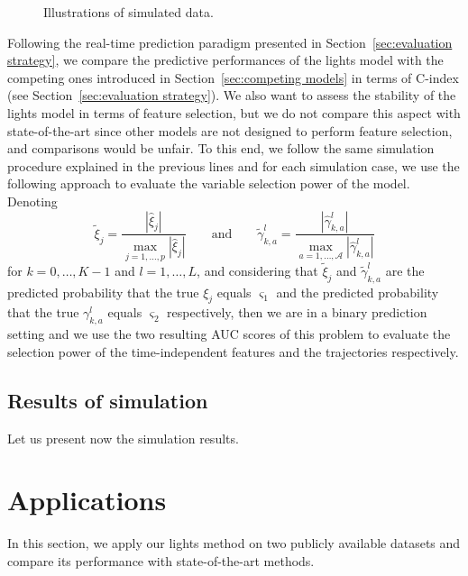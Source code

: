 \documentclass[11pt]{article}
\newcommand{\cA}{\mathcal A}
\begin{document}
\begin{figure}[!htb]
\centering
\subfigure[blabla]{
\label{fig:yoyo}}
\hspace{.02\textwidth}
\caption{Illustrations of simulated data.}
\end{figure}

Following the real-time prediction paradigm presented in Section~\ref{sec:evaluation strategy}, we compare the predictive performances of the lights model with the competing ones introduced in Section~\ref{sec:competing models} in terms of C-index (see Section~\ref{sec:evaluation strategy}).
We also want to assess the stability of the lights model in terms of feature selection, but we do not compare this aspect with state-of-the-art since other models are not designed to perform feature selection, and comparisons would be unfair. 
To this end, we follow the same simulation procedure explained in the previous lines and for each simulation case, we use the following approach to evaluate the variable selection power of the model. Denoting 
\[\tilde{\xi}_j = \dfrac{|\hat{\xi}_j|}{\max_{j=1,\ldots,p}{|\hat{\xi}_j|}} \qquad \text{and} \qquad \tilde{\gamma}_{k,a}^l = \dfrac{|\hat{\gamma}_{k,a}^l|}{\max_{a=1, \ldots, \cA}{|\hat{\gamma}_{k,a}^l|}}\] 
for $k=0,\ldots,K-1$ and $l=1, \ldots, L$, and considering that $\tilde{\xi}_j$ and $\tilde{\gamma}_{k,a}^l$ are the predicted probability that the true $\xi_j$ equals $\varsigma_1$ and the predicted probability that the true $\gamma_{k,a}^l$ equals $\varsigma_2$ respectively, then we are in a binary prediction setting and we use the two resulting AUC scores of this problem to evaluate the selection power of the time-independent features and the trajectories respectively.

\subsection{Results of simulation}
\label{sec:simulation results}
Let us present now the simulation results.


\section{Applications}
\label{sec:application}

In this section, we apply our lights method on two publicly available datasets and compare its performance with state-of-the-art methods.
\end{document}
